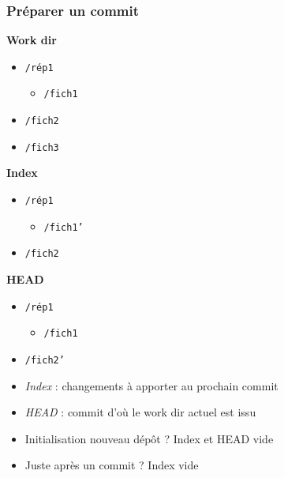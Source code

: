 \documentclass[english, french]{beamer}
\begin{document}
\begin{frame}
	\frametitle{Préparer un commit}
	\begin{minipage}[t]{0.33 \columnwidth}
		\textbf{Work dir}
		\begin{itemize}
			\item[] \texttt{/rép1}
			\begin{itemize}
				\item[] \texttt{/fich1}
			\end{itemize}\vspace{-0.8ex}
			\item[] \texttt{/fich2}
			\item[] \texttt{/fich3}
		\end{itemize}
	\end{minipage}%
	\begin{minipage}[t]{0.33 \columnwidth}
		\textbf{Index}
		\begin{itemize}
			\item[] \texttt{/rép1}
			\begin{itemize}
				\item[] \texttt{/fich1'}
			\end{itemize}\vspace{-0.8ex}
			\item[] \texttt{/fich2}
		\end{itemize}
	\end{minipage}%
	\begin{minipage}[t]{0.33 \columnwidth}
		\textbf{HEAD}
		\begin{itemize}
			\item[] \texttt{/rép1}
			\begin{itemize}
				\item[] \texttt{/fich1}
			\end{itemize}\vspace{-0.8ex}
			\item[] \texttt{/fich2'}
		\end{itemize}
	\end{minipage}
	\begin{itemize}
		\item \emph{Index} : changements à apporter au prochain commit
		\item \emph{HEAD} : commit d’où le work dir actuel est issu
		\item Initialisation nouveau dépôt ? \pause Index et HEAD vide \pause
		\item Juste après un commit ? \pause Index vide
	\end{itemize}
\end{frame}
\end{document}
